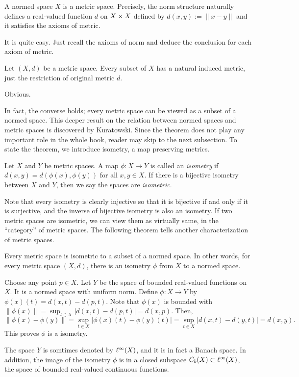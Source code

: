 \documentclass{../crs}
\begin{document}
\begin{ex}
A normed space $X$ is a metric space.
Precisely, the norm structure naturally defines a real-valued function $d$ on $X\times X$ defined by $d(x,y):=\|x-y\|$ and it satisfies the axioms of metric.
\end{ex}
\begin{pf}
It is quite easy.
Just recall the axioms of norm and deduce the conclusion for each axiom of metric.
\end{pf}
\begin{ex}
Let $(X,d)$ be a metric space.
Every subset of $X$ has a natural induced metric, just the restriction of original metric $d$.
\end{ex}
\begin{pf}
Obvious.
\end{pf}

In fact, the converse holds; every metric space can be viewed as a subset of a normed space.
This deeper result on the relation between normed spaces and metric spaces is discovered by Kuratowski.
Since the theorem does not play any important role in the whole book, reader may skip to the next subsection.
To state the theorem, we introduce isometry, a map preserving metrics.

\begin{defn}
Let $X$ and $Y$ be metric spaces.
A map $\phi:X\to Y$ is called an \emph{isometry} if $d(x,y)=d(\phi(x),\phi(y))$ for all $x,y\in X$.
If there is a bijective isometry between $X$ and $Y$, then we say the spaces are \emph{isometric}.
\end{defn}

Note that every isometry is clearly injective so that it is bijective if and only if it is surjective, and the inverse of bijective isometry is also an isometry.
If two metric spaces are isometric, we can view them as virtually same, in the ``category'' of metric spaces.
The following theorem tells another characterization of metric spaces.

\begin{prop}
Every metric space is isometric to a subset of a normed space.
In other words, for every metric space $(X,d)$, there is an isometry $\phi$ from $X$ to a normed space.
\end{prop}
\begin{pf}
Choose any point $p\in X$.
Let $Y$ be the space of bounded real-valued functions on $X$.
It is a normed space with uniform norm.
Define $\phi:X\to Y$ by $\phi(x)(t)=d(x,t)-d(p,t)$.
Note that $\phi(x)$ is bounded with $\|\phi(x)\|=\sup_{t\in X}|d(x,t)-d(p,t)|=d(x,p)$.
Then,
\[\|\phi(x)-\phi(y)\|=\sup_{t\in X}|\phi(x)(t)-\phi(y)(t)|=\sup_{t\in X}|d(x,t)-d(y,t)|=d(x,y).\]
This proves $\phi$ is a isometry.
\end{pf}
\begin{rmk}
The space $Y$ is somtimes denoted by $\ell^\infty(X)$, and it is in fact a Banach space.
In addition, the image of the isometry $\phi$ is in a closed subspace $C_b(X)\subset\ell^\infty(X)$, the space of bounded real-valued continuous functions.
\end{rmk}
\end{document}
